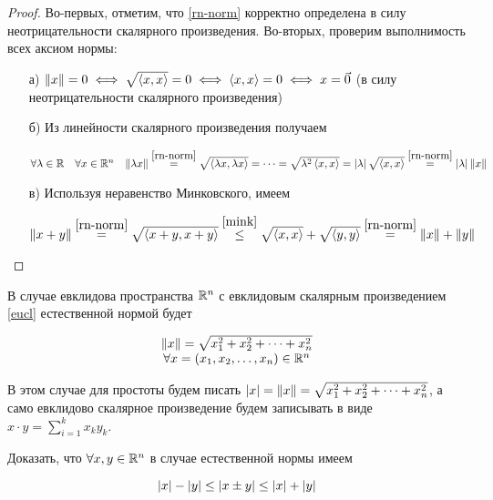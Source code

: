 \documentclass[../../main.tex]{subfiles}
\begin{document}
\begin{proof}
 Во-первых, отметим, что \eqref{rn-norm} корректно определена в силу 
 неотрицательности скалярного произведения. Во-вторых, проверим
 выполнимость всех аксиом нормы:
 
 \begin{enumerate}
  \item[а)]
  $\lVert{x}\rVert = 0 \iff \sqrt{\left<x, x\right>} = 0 \iff
  \left<x, x\right> = 0 \iff x = \vec 0$ (в силу 
  неотрицательности скалярного произведения)
  
  \item[б)]
  Из линейности скалярного произведения получаем
  
  $\forall \lambda \in \mathbb{R} \quad \forall x \in \mathbb{R}^n \quad
   \lVert{\lambda x}\rVert \stackrel{\eqref{rn-norm}}{=}
   \sqrt{\left<\lambda x, \lambda x\right>} = \dots =
   \sqrt{\lambda^2\left<x, x\right>} =
   \left|{\lambda}\right| \sqrt{\left<x, x\right>} \stackrel{\eqref{rn-norm}}{=}
   \left|{\lambda}\right| \lVert{x}\rVert$
 
  \item[в)]
  Используя неравенство Минковского, имеем
  
  $\lVert{x+y}\rVert \stackrel{\eqref{rn-norm}}{=}
   \sqrt{\left<x+y, x+y\right>} \stackrel{\eqref{mink}}{\le}
   \sqrt{\left<x, x\right>} + \sqrt{\left<y, y\right>}
   \stackrel{\eqref{rn-norm}}{=} \lVert{x}\rVert + \lVert{y}\rVert$
 \end{enumerate}
 
\end{proof}

\begin{rem}
 В случае евклидова пространства $\mathbb{R}^n$ с евклидовым скалярным 
 произведением \eqref{eucl} естественной нормой будет
 
 \[\begin{array}{c}
    \lVert{x}\rVert = \sqrt{x_1^2 + x_2^2 + \dots + x_n^2} \\
    \forall x = (x_1, x_2, \dots, x_n) \in \mathbb{R}^n
   \end{array}\]
   
 В этом случае для простоты будем писать $\left|{x}\right| = \lVert{x}\rVert = 
 \sqrt{x_1^2 + x_2^2 + \dots + x_n^2}$, а само евклидово скалярное
 произведение будем записывать в виде $x\cdot y = \sum\limits_{i=1}^k 
 x_ky_k$.

\end{rem}

\begin{exc}
  Доказать, что $\forall x, y \in \mathbb{R}^n$ в случае естественной нормы
  имеем
  
  \[\left|{x}\right| - \left|{y}\right| \le \left|{x \pm y}\right| \le \left|{x}\right| + \left|{y}\right|\]
\end{exc}
\end{document}
